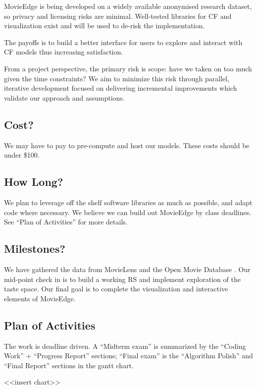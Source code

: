 MovieEdge is being developed on a widely available anonymised research dataset, so privacy and licensing risks are minimal. Well-tested libraries for CF and visualization exist and will be used to de-risk the implementation. 

The payoffs is to build a better interface for users to explore and interact with CF models thus increasing satisfaction. 

From a project perspective, the primary risk is scope: have we taken on too much given the time constraints?   We aim to minimize this risk through parallel, iterative development focused on delivering incremental improvements which validate our approach and assumptions.

\subsection{Cost?}
We may have to pay to pre-compute and host our models. These costs should be under \$100.

\subsection{How Long?}
We plan to leverage off the shelf software libraries as much as possible, and adapt code where necessary. We believe we can build out MovieEdge by class deadlines. See “Plan of Activities” for more details.

\subsection{Milestones?}
We have gathered the data from MovieLens \cite{harper2016movielens} and the Open Movie Database \cite{openMovieDB}. Our mid-point check in is to build a working RS and implement exploration of the taste space. Our final goal is to complete the visualization and interactive elements of MovieEdge.

\subsection{Plan of Activities}

The work is deadline driven.  A “Midterm exam” is summarized by the “Coding Work” + “Progress Report” sections; “Final exam” is the “Algorithm Polish” and “Final Report” sections in the gantt chart.

<<insert chart>>


